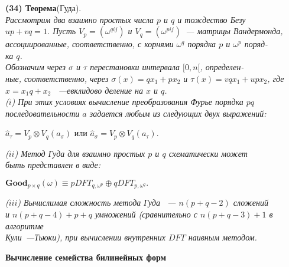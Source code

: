 \documentclass{mai_book}
\begin{document}
{	\medskip
	\noindent \textbf{(34) Теорема}(Гуда). \\ 
	\indent\textit{Рассмотрим два взаимно простых числа $p$ и $q$ и тождество Безу \\$up + vq = 1$. Пусть $V_p = (\omega^{qij})$ и $V_q = (\omega^{pij})$~--- матрицы Вандермонда, \\ ассоциированные, соответственно, с корнями $\omega^q$ порядка $p$ и $\omega^p$ поряд-\\ ка $q$. \\ 
		\indent Обозначим через $\sigma$ и  $\tau$ перестановки интервала $[0, n[$, определен-\\ные, соответственно, через $\sigma(x) = qx_1 + px_2$ и $\tau(x) = vqx_1 + upx_2$, где \\ $x = x_1q + x_2$ ~---евклидово деление на $x$ и $q$.} \\
	\textit{\indent ($i$) При этих условиях вычисление преобразования Фурье порядка $pq$ \\ последовательности $a$ задается любым из следующих двух выражений:}\\
	\begin{center}
		$\hat{a}_\tau = V_p \otimes V_q (a_\sigma)$ или $\hat{a}_\sigma = V_p \otimes V_q (a_\tau)$.
	\end{center} 	
	\textit{\indent ($ii$) Метод Гуда для взаимно простых $p$ и  $q$ схематически может \\ быть представлен в виде:\\}
	 \begin{center}
	 	$\textbf{Good}_{p\times q }(\omega) \equiv p DFT_{q, \omega^p} \oplus q DFT_{p, \omega^q}.$
	 \end{center} 
	\textit{\indent ($iii$) Вычислимая сложность метода Гуда ~--- $n(p+q-2)$ сложений \\ и $n(p+q-4)+p+q$ умножений (сравнительно с  $n(p+q-3)+1$ в алгоритме \\ Кули~---Тьюки), при вычислении внутренних $DFT$ наивным методом.}
	\newpage 
	\bigskip
	\begin{Large}
		\textbf{ Вычисление семейства билинейных форм}
	\end{Large} 
	   
    \medskip
    
}
\end{document}
